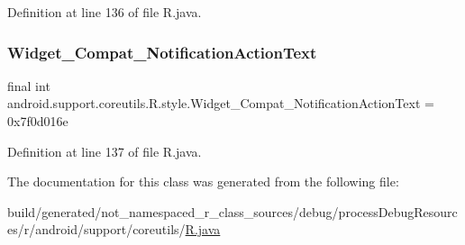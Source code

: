 Definition at line 136 of file R.\+java.

\mbox{\label{classandroid_1_1support_1_1coreutils_1_1_r_1_1style_afecf35538e16fa5d87a95f377bcd856d}} 
\subsubsection{\texorpdfstring{Widget\_Compat\_NotificationActionText}{Widget\_Compat\_NotificationActionText}}
{\footnotesize\ttfamily final int android.\+support.\+coreutils.\+R.\+style.\+Widget\+\_\+\+Compat\+\_\+\+Notification\+Action\+Text = 0x7f0d016e\hspace{0.3cm}{\ttfamily [static]}}



Definition at line 137 of file R.\+java.



The documentation for this class was generated from the following file\+:\begin{DoxyCompactItemize}
\item 
build/generated/not\+\_\+namespaced\+\_\+r\+\_\+class\+\_\+sources/debug/process\+Debug\+Resources/r/android/support/coreutils/\mbox{\hyperlink{android_2support_2coreutils_2_r_8java}{R.\+java}}\end{DoxyCompactItemize}
